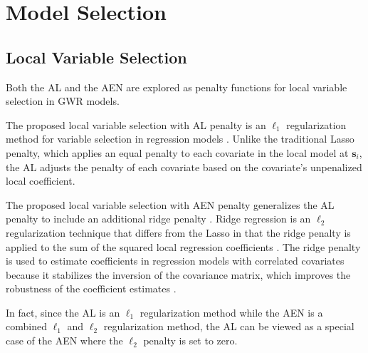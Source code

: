 \documentclass[authoryear, review, 11pt]{elsarticle}
\begin{document}
	
	 
	
\section{Model Selection \label{section:model-selection}}
	\subsection{Local Variable Selection}
	Both the AL and the AEN are explored as penalty functions for local variable selection in GWR models.
	
	The proposed local variable selection with AL penalty is an $\ell_1$ regularization method for variable selection in regression models \citep{Zou:2006}. Unlike the traditional Lasso penalty, which applies an equal penalty to each covariate in the local model at $\bm{s}_i$, the AL adjusts the penalty of each covariate based on the covariate's unpenalized local coefficient.	
	
	The proposed local variable selection with AEN penalty generalizes the AL penalty to include an additional ridge penalty \citep{Zou:2009}. Ridge regression is an $\ell_2$ regularization technique that differs from the Lasso in that the ridge penalty is applied to the sum of the squared local regression coefficients \citep{Hoerl:1970}. The ridge penalty is used to estimate coefficients in regression models with correlated covariates because it stabilizes the inversion of the covariance matrix, which improves the robustness of the coefficient estimates \citep{Hastie:2009}.
	
	In fact, since the AL is an $\ell_1$ regularization method while the AEN is a combined $\ell_1$ and $\ell_2$ regularization method, the AL can be viewed as a special case of the AEN where the $\ell_2$ penalty is set to zero.
	
\end{document}
